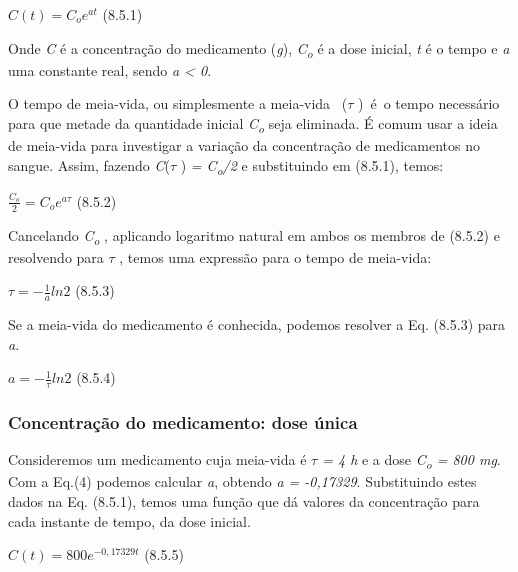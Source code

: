 \begin{FlushRight}
 \( C \left( t \right) =C_{o}e^{at} \) \quad \quad \quad \quad \quad \quad (8.5.1)
\end{FlushRight}

Onde \textit{C} é a concentração do medicamento (\textit{g}), \textit{C\textsubscript{o}} é a dose inicial, \textit{t} é o tempo e \textit{a} uma constante real, sendo \textit{a < 0}.

O tempo de meia-vida, ou simplesmente a meia-vida~ ($ \tau$ )~é~o tempo necessário para que metade da quantidade inicial   \textit{C\textsubscript{o}} seja eliminada. É comum usar a ideia de meia-vida para investigar a variação da concentração de medicamentos no sangue. Assim, fazendo \textit{C}($ \tau$ ) \textit{= C\textsubscript{o}/2} e substituindo em (8.5.1), temos:

\begin{FlushRight}
 \( \frac{C_{o}}{2}=C_{o}e^{a \tau} \) \quad \quad \quad \quad \quad \quad (8.5.2)
\end{FlushRight}

Cancelando \textit{C\textsubscript{o}} , aplicando logaritmo natural em ambos os membros de (8.5.2) e resolvendo para $ \tau$ , temos uma expressão para o tempo de meia-vida:

\begin{FlushRight}
 \(  \tau=-\frac{1}{a}ln2 \) \quad \quad \quad \quad \quad \quad (8.5.3)
\end{FlushRight}

Se a meia-vida do medicamento é conhecida, podemos resolver a Eq. (8.5.3) para \textit{a}. 

\begin{FlushRight}
 \( a=-\frac{1}{ \tau}ln2 \) \quad \quad \quad \quad \quad \quad (8.5.4)
\end{FlushRight}

\subsubsection{Concentração do medicamento: dose única}

Consideremos um medicamento cuja meia-vida é \textit{$ \tau$  = 4 h} e a dose \textit{C\textsubscript{o} = 800 mg}. Com a Eq.(4) podemos calcular \textit{a}, obtendo \textit{a = -0,17329}. Substituindo estes dados na Eq. (8.5.1), temos uma função que dá valores da concentração para cada instante de tempo, da dose inicial.

\begin{FlushRight}
 \( C \left( t \right) =800e^{-0,17329 t} \) \quad \quad \quad \quad (8.5.5)
\end{FlushRight}

